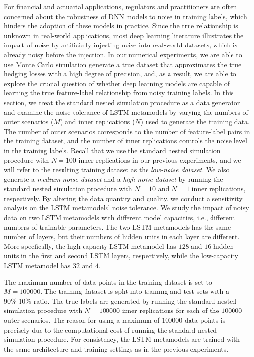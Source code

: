 For financial and actuarial applications, regulators and practitioners are often concerned about the robustness of DNN models to noise in training labels, which hinders the adoption of these models in practice.
Since the true relationship is unknown in real-world applications, most deep learning literature illustrates the impact of noise by artificially injecting noise into real-world datasets, which is already noisy before the injection.
In our numerical experiments, we are able to use Monte Carlo simulation generate a true dataset that approximates the true hedging losses with a high degree of precision, and, as a result, we are able to explore the crucial question of whether deep learning models are capable of learning the true feature-label relationship from noisy training labels.
In this section, we treat the standard nested simulation procedure as a data generator and examine the noise tolerance of LSTM metamodels by varying the numbers of outer scenarios ($M$) and inner replications ($N$) used to generate the training data.
The number of outer scenarios corresponds to the number of feature-label pairs in the training dataset, and the number of inner replications controls the noise level in the training labels.
Recall that we use the standard nested simulation procedure with $N=100$ inner replications in our previous experiments, and we will refer to the resulting training dataset as the \textit{low-noise dataset}.
We also generate a \textit{medium-noise dataset} and a \textit{high-noise dataset} by running the standard nested simulation procedure with $N=10$ and $N=1$ inner replications, respectively.
By altering the data quantity and quality, we conduct a sensitivity analysis on the LSTM metamodels' noise tolerance.
We study the impact of noisy data on two LSTM metamodels with different model capacities, i.e., different numbers of trainable parameters.
The two LSTM metamodels has the same number of layers, but their numbers of hidden units in each layer are different.
More specfically, the high-capacity LSTM metamodel has $128$ and $16$ hidden units in the first and second LSTM layers, respectively, while the low-capacity LSTM metamodel has $32$ and $4$.

The maximum number of data points in the training dataset is set to $M = \num{100000}$.
The training dataset is split into training and test sets with a 90\%-10\% ratio.
The true labels are generated by running the standard nested simulation procedure with $N=\num{100000}$ inner replications for each of the $\num{100000}$ outer scenarios.
The reason for using a maximum of $\num{100000}$ data points is precisely due to the computational cost of running the standard nested simulation procedure.
For consistency, the LSTM metamodels are trained with the same architecture and training settings as in the previous experiments.

